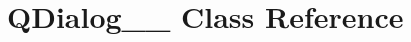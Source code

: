 \hypertarget{classGUI_1_1QtGui_1_1QDialog____13}{}\section{Q\+Dialog\+\_\+\+\_ Class Reference}
\label{classGUI_1_1QtGui_1_1QDialog____13}
